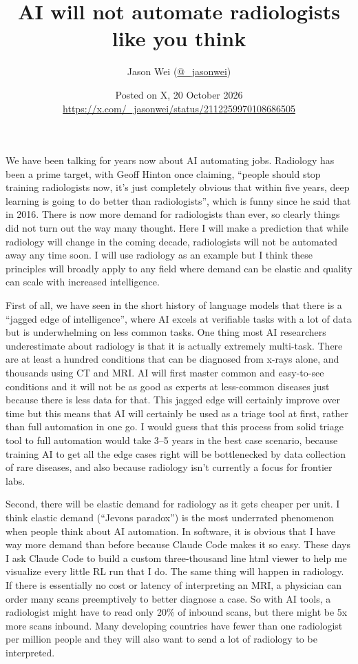 \documentclass[11pt]{article}
\title{\textbf{AI will not automate radiologists like you think}}
\author{Jason Wei (\href{https://x.com/_jasonwei}{@\_jasonwei})}
\date{Posted on X, 20 October 2026\\[0.3em]
\small\url{https://x.com/_jasonwei/status/2112259970108686505}}
\begin{document}
\maketitle

We have been talking for years now about AI automating jobs. Radiology has been a prime target, with Geoff Hinton once claiming, ``people should stop training radiologists now, it's just completely obvious that within five years, deep learning is going to do better than radiologists'', which is funny since he said that in 2016. There is now more demand for radiologists than ever, so clearly things did not turn out the way many thought. Here I will make a prediction that while radiology will change in the coming decade, radiologists will not be automated away any time soon. I will use radiology as an example but I think these principles will broadly apply to any field where demand can be elastic and quality can scale with increased intelligence.

First of all, we have seen in the short history of language models that there is a ``jagged edge of intelligence'', where AI excels at verifiable tasks with a lot of data but is underwhelming on less common tasks. One thing most AI researchers underestimate about radiology is that it is actually extremely multi-task. There are at least a hundred conditions that can be diagnosed from x-rays alone, and thousands using CT and MRI. AI will first master common and easy-to-see conditions and it will not be as good as experts at less-common diseases just because there is less data for that. This jagged edge will certainly improve over time but this means that AI will certainly be used as a triage tool at first, rather than full automation in one go. I would guess that this process from solid triage tool to full automation would take 3--5 years in the best case scenario, because training AI to get all the edge cases right will be bottlenecked by data collection of rare diseases, and also because radiology isn't currently a focus for frontier labs.

Second, there will be elastic demand for radiology as it gets cheaper per unit. I think elastic demand (``Jevons paradox'') is the most underrated phenomenon when people think about AI automation. In software, it is obvious that I have way more demand than before because Claude Code makes it so easy. These days I ask Claude Code to build a custom three-thousand line html viewer to help me visualize every little RL run that I do. The same thing will happen in radiology. If there is essentially no cost or latency of interpreting an MRI, a physician can order many scans preemptively to better diagnose a case. So with AI tools, a radiologist might have to read only 20\% of inbound scans, but there might be 5x more scans inbound. Many developing countries have fewer than one radiologist per million people and they will also want to send a lot of radiology to be interpreted.
\end{document}
